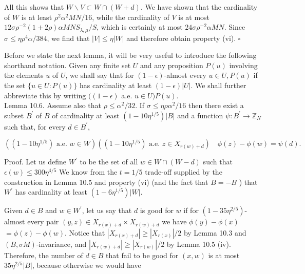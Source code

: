 \documentclass[10pt]{article}
\begin{document}
All this shows that $W \backslash V \subset W \cap(W+d)$. We have shown that the cardinality of $W$ is at least $\rho^{2} \alpha^{2} M N / 16$, while the cardinality of $V$ is at most $12 \sigma \rho^{-2}(1+2 \rho) \alpha M N S_{\lambda, \mu} / S$, which is certainly at most $24 \sigma \rho^{-2} \alpha M N$. Since $\sigma \leqslant \eta \rho^{4} \alpha / 384$, we find that $|V| \leqslant \eta|W|$ and therefore obtain property (vi). \(\square\)

Before we state the next lemma, it will be very useful to introduce the following shorthand notation. Given any finite set $U$ and any proposition $P(u)$ involving the elements $u$ of $U$, we shall say that for $(1-\epsilon)$-almost every $u \in U, P(u)$ if the set $\{u \in U: P(u)\}$ has cardinality at least $(1-\epsilon)|U|$. We shall further abbreviate this by writing $((1-\epsilon)$ a.e. $u \in U) P(u)$.\\
Lemma 10.6. Assume also that $\rho \leqslant \alpha^{2} / 32$. If $\sigma \leqslant \eta \rho \alpha^{2} / 16$ then there exist a subset $B^{\prime}$ of $B$ of cardinality at least $\left(1-10 \eta^{1 / 5}\right)|B|$ and a function $\psi: B^{\prime} \rightarrow \mathbb{Z}_{N}$ such that, for every $d \in B^{\prime}$,

$$
\left(\left(1-10 \eta^{1 / 5}\right) \text { a.e. } w \in W\right)\left(\left(1-10 \eta^{1 / 5}\right) \text { a.e. } z \in X_{r(w)+d}\right) \quad \phi(z)-\phi(w)=\psi(d) .
$$

Proof. Let us define $W^{\prime}$ to be the set of all $w \in W \cap(W-d)$ such that $\epsilon(w) \leqslant 300 \eta^{4 / 5}$ We know from the $t=1/5$ trade-off supplied by the construction in Lemma 10.5 and property (vi) (and the fact that $B=-B$ ) that $W^{\prime}$ has cardinality at least $\left(1-6 \eta^{1 / 5}\right)|W|$.

Given $d \in B$ and $w \in W^{\prime}$, let us say that $d$ is good for $w$ if for $\left(1-35 \eta^{2 / 5}\right)$-almost every pair $(y, z) \in X_{r(x)+d} \times X_{r(w)+d}$ we have $\phi(y)-\phi(x)$\\
$=\phi(z)-\phi(w)$. Notice that $\left|X_{r(x)+d}\right| \geqslant\left|X_{r(x)}\right| / 2$ by Lemma 10.3 and $(B, \sigma M)$-invariance, and $\left|X_{r(w)+d}\right| \geqslant\left|X_{r(w)}\right| / 2$ by Lemma 10.5 (iv). Therefore, the number of $d \in B$ that fail to be good for $(x, w)$ is at most $35 \eta^{2 / 5}|B|$, because otherwise we would have
\end{document}
